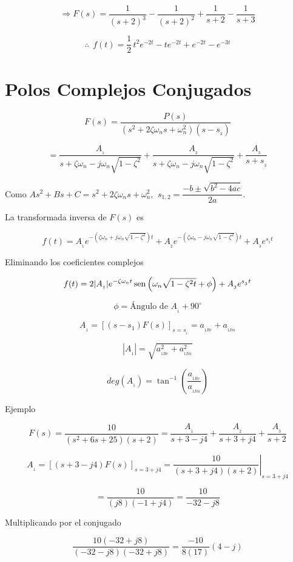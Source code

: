 $$\Rightarrow F(s) = \dfrac{1}{(s + 2)^3} - \dfrac{1}{(s + 2)^2} + \dfrac{1}{s + 2} - \dfrac{1}{s + 3}$$

$$\therefore \:\: f(t) = \dfrac{1}{2}\, t^2 e^{-2t} - te^{-2t} + e^{-2t} - e^{-3t}$$


\section{Polos Complejos Conjugados}

$$F(s) = \dfrac{P(s)}{(s^2 + 2\zeta \omega_{n}s + \omega_{n}^2)(s - s_{_{3}})}$$

$$= \dfrac{A_{_{1}}}{s + \zeta \omega_{n} - j\omega_{n} \sqrt{1 - \zeta^2}} + \dfrac{A_{_{2}}}{s + \zeta \omega_{n} - j\omega_{n} \sqrt{1 - \zeta^2}} + \dfrac{A_{_{3}}}{s + s_{_3}}$$

Como $As^2 + Bs + C = s^2 + 2\zeta \omega_{n}s +\omega_{n}^{2}$, $\: s_{1,2} = \dfrac{- b \pm \sqrt{b^2 - 4ac}}{2a}.$

La transformada inversa de $F(s)$ es

$$f(t) = A_{_{1}} e^{- \left( \zeta \omega_{n} + j\omega_{n} \sqrt{1 - \zeta^2} \right)t } + A_{_2} e^{- \left( \zeta \omega_{n} - j\omega_{n} \sqrt{1 - \zeta^2} \right)t } + A_{_3} e^{s_{_3} t}$$

Eliminando los coeficientes complejos

$$f(t) = 2 |A_{_1}| e^{-\zeta \omega_{n}t} \mathop{\rm sen}\nolimits \left( \omega_{n} \sqrt{1 - \zeta^2 t} + \phi \right) + A_{_3}e^{s_{_3}t}$$

$$\phi = \mbox{Ángulo de } A_{_1} + 90^\circ$$

$$A_{_1} = \left[ (s - s_1)F(s)\right]_{s = s_{_1}} = a_{_{1Re}} + a_{_{1Im}}$$

$$|A_{_1}| = \sqrt{a_{_{1Re}}^2 + a_{_{1Im}}^2}$$

$$deg(A_{_1}) = \tan^{-1} \left( \dfrac{a_{_{1Re}}}{a_{_{1Im}}} \right) $$

Ejemplo

$$F(s) = \dfrac{10}{(s^2 + 6s + 25)(s + 2)} = \dfrac{A_{_1}}{s + 3 - j4} + \dfrac{A_{_2}}{s + 3 + j4} + \dfrac{A_{_3}}{s + 2}$$

$$A_{_1} = \left[ (s + 3 - j4) F(s) \right]_{s = 3 + j4} = \left. \dfrac{10}{(s + 3 + j4)(s + 2)} \right|_{s = 3 + j4}$$

$$= \dfrac{10}{(j8)(-1 + j4)} = \dfrac{10}{-32 - j8}$$

Multiplicando por el conjugado

$$\dfrac{10(-32 + j8)}{(-32 - j8)(-32 + j8)} = \dfrac{-10}{8(17)}(4 - j)$$

